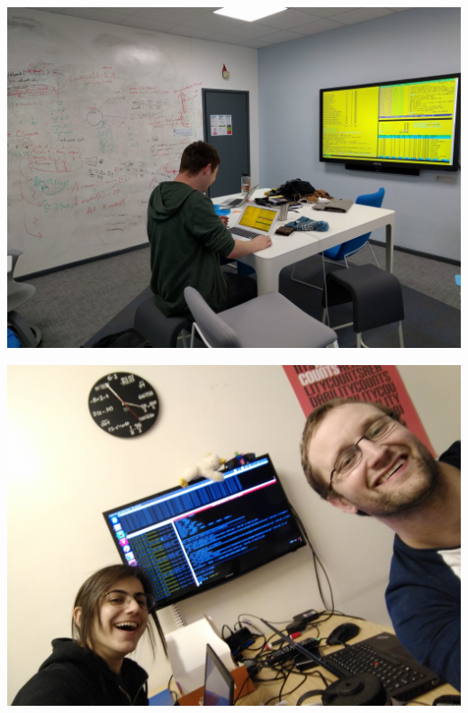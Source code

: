 \documentclass{beamer}
\begin{document}
    \begin{frame}
        \begin{center}
        \includegraphics[width=.8\textwidth]{static/geraint.jpg}\\
        \end{center}
    \end{frame}

    \begin{frame}
        \begin{center}
            \includegraphics[width=.8\textwidth]{static/nik_and_i.jpg}\\
        \end{center}
    \end{frame}
\end{document}
